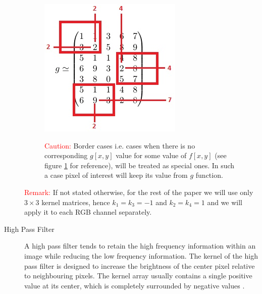 \documentclass{article}
\begin{document}
\begin{description}
\begin{figure}
\noindent
\begin{minipage}{0.3\textwidth}%
	\includegraphics[width=\linewidth]{_Figures/conv_filter_border.jpg} 
	\caption{}
	\label{fig:caution}
\end{minipage}%
\hfill%
\begin{minipage}{0.6\textwidth}\raggedleft
\textcolor{red}{Caution:} Border cases i.e. cases when there is no corresponding $g[x,y]$ value for some value of $f[x,y]$ (see figure \ref{fig:caution} for reference), will be treated as special ones. In such a case pixel of interest will keep its value from $g$ function.
\end{minipage}
\end{figure}

\textcolor{red}{Remark:} If not stated otherwise, for the rest of the paper we will use only $3 \times 3$ kernel matrices, hence $k_1 = k_3 = -1$ and $k_2 = k_4 = 1$ and we will apply it to each RGB channel separately. 

%
%
\item[High Pass Filter]
A high pass filter tends to retain the high frequency information within an image while reducing the low frequency information. The kernel of the high pass filter is designed to increase the brightness of the center pixel relative to neighbouring pixels. The kernel array usually contains a single positive value at its center, which is completely surrounded by negative values \cite{high_pass_def}. 


\end{description}
\end{document}
